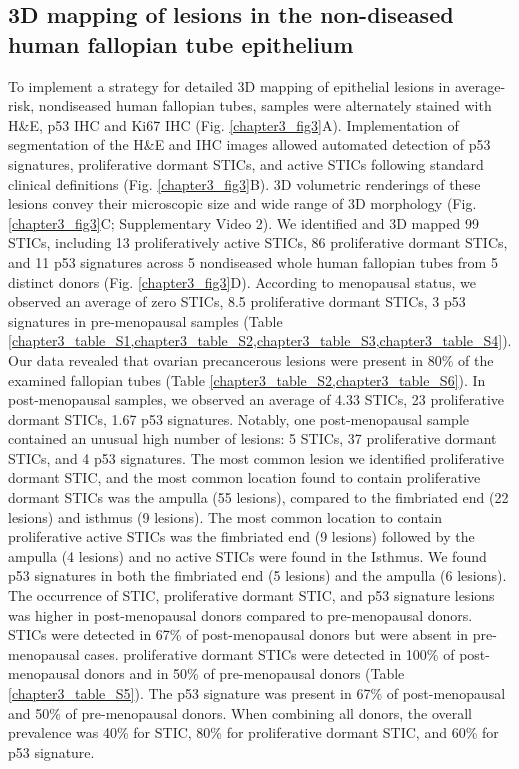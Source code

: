 \begin{refsection}
    \subsection{3D mapping of lesions in the non-diseased human fallopian tube epithelium}
    To implement a strategy for detailed 3D mapping of epithelial lesions in average-risk, nondiseased human fallopian tubes, samples were alternately stained with H\&E, p53 IHC and Ki67 IHC (Fig. \ref{chapter3_fig3}A). Implementation of segmentation of the H\&E and IHC images allowed automated detection of p53 signatures, proliferative dormant STICs, and active STICs following standard clinical definitions (Fig. \ref{chapter3_fig3}B). 3D volumetric renderings of these lesions convey their microscopic size and wide range  of 3D morphology (Fig. \ref{chapter3_fig3}C; Supplementary Video 2). 
    We identified and 3D mapped 99 STICs, including 13 proliferatively active STICs, 86 proliferative dormant STICs, and 11 p53 signatures across 5 nondiseased whole human fallopian tubes from 5 distinct donors (Fig. \ref{chapter3_fig3}D). According to menopausal status, we observed an average of zero STICs, 8.5 proliferative dormant STICs, 3 p53 signatures in pre-menopausal samples (Table \ref{chapter3_table_S1,chapter3_table_S2,chapter3_table_S3,chapter3_table_S4}). Our data revealed that ovarian precancerous lesions were present in 80\% of the examined fallopian tubes (Table \ref{chapter3_table_S2,chapter3_table_S6}).  In post-menopausal samples, we observed an average of 4.33 STICs, 23 proliferative dormant STICs, 1.67 p53 signatures. Notably, one post-menopausal sample contained an unusual high number of lesions: 5 STICs, 37 proliferative dormant STICs, and 4 p53 signatures. The most common lesion we identified proliferative dormant STIC, and the most common location found to contain proliferative dormant STICs was the ampulla (55 lesions), compared to the fimbriated end (22 lesions) and isthmus (9 lesions). The most common location to contain proliferative active STICs was the fimbriated end (9 lesions) followed by the ampulla (4 lesions) and no active STICs were found in the Isthmus. We found p53 signatures in both the fimbriated end (5 lesions) and the ampulla (6 lesions).
    The occurrence of STIC, proliferative dormant STIC, and p53 signature lesions was higher in post-menopausal donors compared to pre-menopausal donors. STICs were detected in 67\% of post-menopausal donors but were absent in pre-menopausal cases. proliferative dormant STICs were detected in 100\% of post-menopausal donors and in 50\% of pre-menopausal donors (Table \ref{chapter3_table_S5}). The p53 signature was present in 67\% of post-menopausal and 50\% of pre-menopausal donors. When combining all donors, the overall prevalence was 40\% for STIC, 80\% for proliferative dormant STIC, and 60\% for p53 signature. 
    

\end{refsection}
